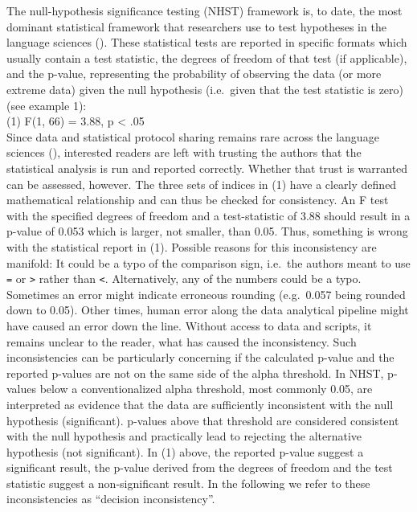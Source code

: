 \documentclass[
  doc,
  longtable,
  nolmodern,
  notxfonts,
  notimes,
  colorlinks=true,linkcolor=blue,citecolor=blue,urlcolor=blue]{apa7}
\begin{document}
The null-hypothesis significance testing (NHST) framework is, to date,
the most dominant statistical framework that researchers use to test
hypotheses in the language sciences
(). These statistical tests are reported in specific formats which
usually contain a test statistic, the degrees of freedom of that test
(if applicable), and the p-value, representing the probability of
observing the data (or more extreme data) given the null hypothesis
(i.e.~given that the test statistic is zero) (see example 1):\\
(1) F(1, 66) = 3.88, p \textless{} .05\\
Since data and statistical protocol sharing remains rare across the
language sciences (), interested readers are left with trusting the authors that
the statistical analysis is run and reported correctly. Whether that
trust is warranted can be assessed, however. The three sets of indices
in (1) have a clearly defined mathematical relationship and can thus be
checked for consistency. An F test with the specified degrees of freedom
and a test-statistic of 3.88 should result in a p-value of 0.053 which
is larger, not smaller, than 0.05. Thus, something is wrong with the
statistical report in (1). Possible reasons for this inconsistency are
manifold: It could be a typo of the comparison sign, i.e.~the authors
meant to use \texttt{=} or \texttt{\textgreater{}} rather than
\texttt{\textless{}}. Alternatively, any of the numbers could be a typo.
Sometimes an error might indicate erroneous rounding (e.g.~0.057 being
rounded down to 0.05). Other times, human error along the data
analytical pipeline might have caused an error down the line. Without
access to data and scripts, it remains unclear to the reader, what has
caused the inconsistency. Such inconsistencies can be particularly
concerning if the calculated p-value and the reported p-values are not
on the same side of the alpha threshold. In NHST, p-values below a
conventionalized alpha threshold, most commonly 0.05, are interpreted as
evidence that the data are sufficiently inconsistent with the null
hypothesis (significant). p-values above that threshold are considered
consistent with the null hypothesis and practically lead to rejecting
the alternative hypothesis (not significant). In (1) above, the reported
p-value suggest a significant result, the p-value derived from the
degrees of freedom and the test statistic suggest a non-significant
result. In the following we refer to these inconsistencies as ``decision
inconsistency''.
\end{document}
